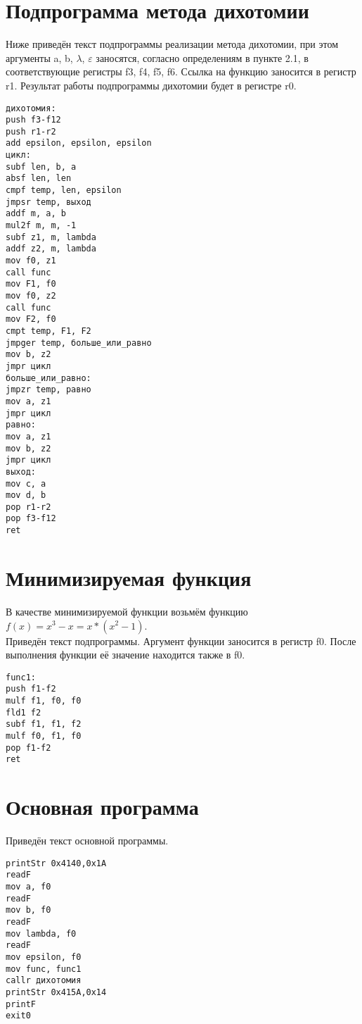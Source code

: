 \documentclass[14pt]{report}
\begin{document}
\section{Подпрограмма метода дихотомии}
Ниже приведён текст подпрограммы реализации метода дихотомии, при этом аргументы a, b, $\lambda$, $\varepsilon$ заносятся, согласно определениям в пункте 2.1, в соответствующие регистры f3, f4, f5, f6. Ссылка на функцию заносится в регистр r1. Результат работы подпрограммы дихотомии будет в регистре r0.

\begin{verbatim}
дихотомия:
push f3-f12
push r1-r2
add epsilon, epsilon, epsilon
цикл:
subf len, b, a
absf len, len
cmpf temp, len, epsilon
jmpsr temp, выход
addf m, a, b
mul2f m, m, -1
subf z1, m, lambda
addf z2, m, lambda
mov f0, z1
call func
mov F1, f0
mov f0, z2
call func
mov F2, f0
cmpt temp, F1, F2
jmpger temp, больше_или_равно
mov b, z2
jmpr цикл
больше_или_равно:
jmpzr temp, равно
mov a, z1
jmpr цикл    
равно:
mov a, z1
mov b, z2
jmpr цикл
выход:
mov c, a
mov d, b
pop r1-r2
pop f3-f12
ret
\end{verbatim}

\section{Минимизируемая функция}
В качестве минимизируемой функции возьмём функцию $f(x)=x^3-x=x*(x^2-1)$. \\Приведён текст подпрограммы. Аргумент функции заносится в регистр f0. После выполнения функции её значение находится также в f0.
\begin{verbatim}
func1:
push f1-f2
mulf f1, f0, f0  
fld1 f2
subf f1, f1, f2  
mulf f0, f1, f0 
pop f1-f2
ret
\end{verbatim}

\section{Основная программа}
Приведён текст основной программы.
\begin{verbatim}
printStr 0x4140,0x1A
readF
mov a, f0
readF
mov b, f0
readF
mov lambda, f0
readF
mov epsilon, f0
mov func, func1
callr дихотомия
printStr 0x415A,0x14    
printF
exit0
\end{verbatim}
\end{document}

